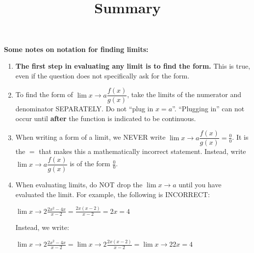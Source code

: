 \documentclass{ximera}
\title[Summary]{Summary}
\begin{document}
\begin{abstract} \end{abstract}
\maketitle


\textbf{Some notes on notation for finding limits:}
\begin{enumerate}
	\item {\bf The first step in evaluating any limit is to find the form.} This is true, even if the question does not specifically ask for the form.

	\item To find the form of $\displaystyle \lim{x \to a}\dfrac{f(x)}{g(x)}$, take the limits of the numerator and denominator 
		SEPARATELY. Do not ``plug in $x=a$''. ``Plugging in'' can not occur until \textbf{after} the function is indicated to be continuous.
	
	\item When writing a form of a limit, we NEVER write $\displaystyle \lim{x \to a}\dfrac{f(x)}{g(x)}=\frac{0}{0}$.  It is the $=$ that makes this a mathematically incorrect statement.  Instead, write $\displaystyle \lim{x \to a}\dfrac{f(x)}{g(x)}$ is of the form $\frac{0}{0}$. 



	\item When evaluating limits, do NOT drop the $\displaystyle \lim{x \to a}$ until you have evaluated the limit.  For example, the following is INCORRECT:
	\begin{center}
		$\displaystyle \lim{x \to 2}\frac{2x^2-4x}{x-2}=\frac{2x(x-2)}{x-2}=2x=4$\\	
	\end{center}

	Instead, we write: 
	\begin{center}
		$\displaystyle \lim{x \to 2}\frac{2x^2-4x}{x-2}=\displaystyle \lim{x \to 2}\frac{2x(x-2)}{x-2}=\displaystyle \lim{x \to 2}2x=4$\\	
	\end{center}

\end{enumerate}
\end{document}
